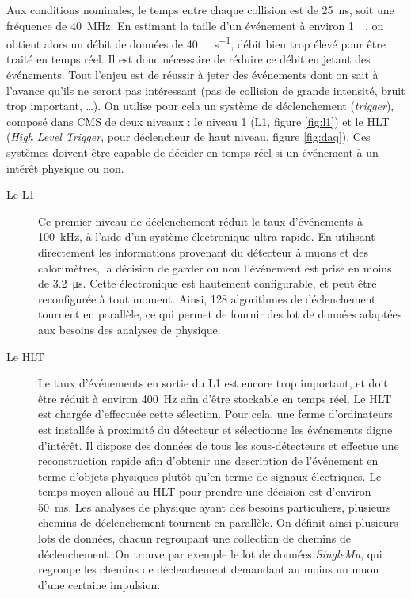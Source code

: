 Aux conditions nominales, le temps entre chaque collision est de \SI{25}{\ns}, soit une fréquence de \SI{40}{\mega\hertz}. En estimant la taille d'un événement à environ \SI{1}{\mega\octet}, on obtient alors un débit de données de \SI{40}{\tera\octet\per\second}, débit bien trop élevé pour être traité en temps réel. Il est donc nécessaire de réduire ce débit en jetant des événements. Tout l'enjeu est de réussir à jeter des événements dont on sait à l'avance qu'ils ne seront pas intéressant (pas de collision de grande intensité, bruit trop important, \ldots). On utilise pour cela un système de déclenchement (\emph{trigger}), composé dans CMS de deux niveaux : le niveau 1 (L1, figure \ref{fig:l1}) et le HLT (\emph{High Level Trigger}, pour déclencheur de haut niveau, figure \ref{fig:daq}). Ces systèmes doivent être capable de décider en temps réel si un événement à un intérêt physique ou non.

\begin{description}
  \item[Le L1] Ce premier niveau de déclenchement réduit le taux d’événements à \SI{100}{\kHz}, à l'aide d'un système électronique ultra-rapide. En utilisant directement les informations provenant du détecteur à muons et des calorimètres, la décision de garder ou non l'événement est prise en moins de \SI{3.2}{\us}. Cette électronique est hautement configurable, et peut être reconfigurée à tout moment. Ainsi, 128 algorithmes de déclenchement tournent en parallèle, ce qui permet de fournir des lot de données adaptées aux besoins des analyses de physique.
  \item[Le HLT] Le taux d'événements en sortie du L1 est encore trop important, et doit être réduit à environ \SI{400}{\Hz} afin d'être stockable en temps réel. Le HLT est chargée d'effectuée cette sélection. Pour cela, une ferme d'ordinateurs est installée à proximité du détecteur et sélectionne les événements digne d’intérêt. Il dispose des données de tous les sous-détecteurs et effectue une reconstruction rapide afin d'obtenir une description de l'événement en terme d'objets physiques plutôt qu'en terme de signaux électriques. Le temps moyen alloué au HLT pour prendre une décision est d'environ \SI{50}{\ms}. Les analyses de physique ayant des besoins particuliers, plusieurs chemins de déclenchement tournent en parallèle. On définit ainsi plusieurs lots de données, chacun regroupant une collection de chemins de déclenchement. On trouve par exemple le lot de données \emph{SingleMu}, qui regroupe les chemins de déclenchement demandant au moins un muon d'une certaine impulsion.
\end{description}

